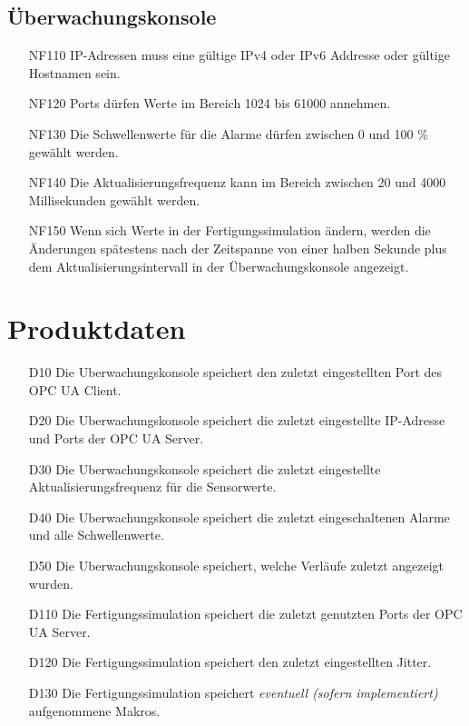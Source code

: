 \documentclass[parskip=full]{scrartcl}
\begin{document}
\subsection{Überwachungskonsole}
\begin{enumerate}
 \item[NF110] IP-Adressen muss eine gültige IPv4 oder IPv6 Addresse oder gültige Hostnamen sein. %
 \item[NF120] Ports dürfen Werte im Bereich 1024 bis 61000 annehmen.
 \item[NF130] Die Schwellenwerte für die Alarme dürfen zwischen 0 und 100 \% gewählt werden.
 \item[NF140] Die Aktualisierungsfrequenz kann im Bereich zwischen 20 und 4000 Millisekunden gewählt werden.
 \item[NF150] Wenn sich Werte in der Fertigungssimulation ändern, werden die Änderungen spätestens nach der Zeitspanne von
   einer halben Sekunde plus dem Aktualisierungsintervall in der Überwachungskonsole angezeigt.
\end{enumerate}

\pagebreak
\section{Produktdaten}
\begin{enumerate}
 \item[D10] Die \gls{Uberwachungskonsole} speichert den zuletzt eingestellten Port des OPC UA Client.
 \item[D20] Die \gls{Uberwachungskonsole} speichert die zuletzt eingestellte IP-Adresse und Ports der OPC UA Server.
 \item[D30] Die \gls{Uberwachungskonsole} speichert die zuletzt eingestellte Aktualisierungsfrequenz für die Sensorwerte.
 \item[D40] Die \gls{Uberwachungskonsole} speichert die zuletzt eingeschaltenen Alarme und alle Schwellenwerte.
 \item[D50] Die \gls{Uberwachungskonsole} speichert, welche Verläufe zuletzt angezeigt wurden.
 \item[D110] Die Fertigungssimulation speichert die zuletzt genutzten Ports der OPC UA Server.
 \item[D120] Die Fertigungssimulation speichert den zuletzt eingestellten \gls{Jitter}.
 \item[D130] Die Fertigungssimulation speichert \emph{eventuell (sofern implementiert)} aufgenommene \glspl{Makro}.
\end{enumerate}
\end{document}
